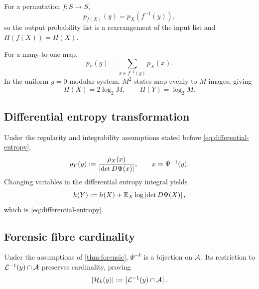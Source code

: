 For a permutation \(f:S\to S\),
\[
p_{f(X)}(y)=p_X(f^{-1}(y)),
\]
so the output probability list is a rearrangement of the input list and \(H(f(X))=H(X)\).

For a many-to-one map,
\[
p_Y(y)=\sum_{x\in f^{-1}(y)}p_X(x).
\]
In the uniform \(g=0\) modular system, \(M^2\) states map evenly to \(M\) images, giving
\[
H(X)=2\log_2M,
\qquad
H(Y)=\log_2M.
\]

\subsection{Differential entropy transformation}

Under the regularity and integrability assumptions stated before \cref{eq:differential-entropy},
\[
\rho_Y(y)
:=
\frac{\rho_X(x)}
{\left\lvert \det D\Psi(x)\right\rvert},
\qquad x=\Psi^{-1}(y).
\]
Changing variables in the differential entropy integral yields
\[
h(Y)
:=
h(X)
+\mathbb E_X\log\left\lvert \det D\Psi(X)\right\rvert,
\]
which is \cref{eq:differential-entropy}.

\subsection{Forensic fibre cardinality}

Under the assumptions of \cref{thm:forensic}, \(\Psi^{-k}\) is a bijection on \(\mathcal A\). Its restriction to
\(\mathcal L^{-1}(y)\cap\mathcal A\) preserves cardinality, proving
\[
\left\lvert \mathcal H_k(y)\right\rvert
:=
\left\lvert \mathcal L^{-1}(y)\cap\mathcal A\right\rvert.
\]
